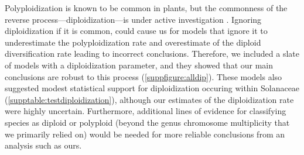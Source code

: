 Polyploidization is known to be common in plants, but the commonness of the reverse process---diploidization---is under active investigation \citep{dodsworth_2015,mandakova_2018}.
%
Ignoring diploidization if it is common, could cause us  for models that ignore it to underestimate the polyploidization rate and overestimate of the diploid diversification rate leading to incorrect conclusions.
Therefore, we included a slate of models with a diploidization parameter, and they showed that our main conclusions are robust to this process (\cref{suppfigure:alldip}).
These models also suggested modest statistical support for diploidization occuring within Solanaceae (\cref{supptable:testdiploidization}), although our estimates of the diploidization rate were highly uncertain.
Furthermore, additional lines of evidence for classifying species as diploid or polyploid (beyond the genus chromosome multiplicity that we primarily relied on) would be needed for more reliable conclusions from an analysis such as ours.


